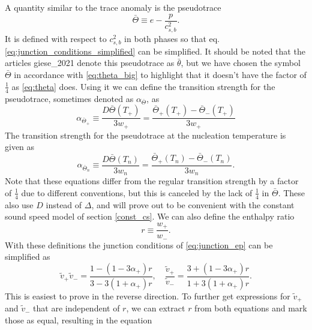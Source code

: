 A quantity similar to the trace anomaly is the pseudotrace
\cites[eq. 34]{giese_2020}[eq. 1]{giese_2021}
\begin{equation}
\bar{\Theta} \equiv e - \frac{p}{c_{s,b}^2}.
\label{eq:theta_bar}
\end{equation}
It is defined with respect to $c_{s,b}^2$ in both phases so that eq. \ref{eq:junction_conditions_simplified} can be simplified.
It should be noted that the articles \cite{giese_2020}{giese_2021} denote this pseudotrace as $\bar{\theta}$,
but we have chosen the symbol $\bar{\Theta}$ in accordance with \eqref{eq:theta_big} to highlight that it doesn't have the factor of $\frac{1}{4}$ as \eqref{eq:theta} does.
Using it we can define the transition strength for the pseudotrace,
sometimes denoted as $\alpha_{\bar{\Theta}}$, as
\cites[eq. 34]{giese_2020}[eq. 1]{giese_2021}
\begin{equation}
\alpha_{\bar{\Theta}_+}
\equiv \frac{D \bar{\Theta}(T_+)}{3w_+}
= \frac{\bar{\Theta}_+(T_+) - \bar{\Theta}_-(T_+)}{3w_+}
\label{eq:alpha_theta_bar_plus}
\end{equation}
The transition strength for the pseudotrace at the nucleation temperature is given as
\begin{equation}
\alpha_{\bar{\Theta}_n}
\equiv \frac{D \bar{\Theta}(T_n)}{3w_n}
= \frac{\bar{\Theta}_+(T_n) - \bar{\Theta}_-(T_n)}{3w_n}.
\label{eq:alpha_theta_bar_n}
\end{equation}
Note that these equations differ from the regular transition strength by a factor of $\frac{1}{4}$ due to different conventions, but this is canceled by the lack of $\frac{1}{4}$ in $\bar{\Theta}$.
These also use $D$ instead of $\Delta$,
and will prove out to be convenient with the constant sound speed model of section \ref{const_cs}.
We can also define the enthalpy ratio
\begin{equation}
r \equiv \frac{w_+}{w_-}.
\end{equation}
With these definitions the junction conditions of \eqref{eq:junction_ep} can be simplified as
\begin{equation}
\tilde{v}_+ \tilde{v}_- = \frac{1-(1-3\alpha_+)r}{3-3(1+\alpha_+)r},
\quad
\frac{\tilde{v}_+}{\tilde{v}_-} = \frac{3+(1-3\alpha_+)r}{1+3(1+\alpha_+)r}.
\label{eq:junction_conditions_simplified}
\end{equation}
This is easiest to prove in the reverse direction.
To further get expressions for $\tilde{v}_+$ and $\tilde{v}_-$ that are independent of $r$, we can extract $r$ from both equations and mark those as equal, resulting in the equation

